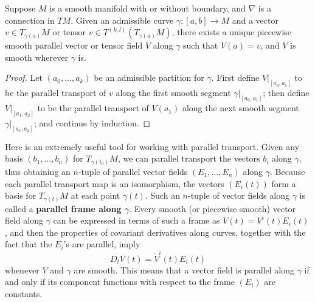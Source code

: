 \begin{corollary}
\label{cor:parallel-transport-piecewise-smooth-curves}
Suppose $M$ is a smooth manifold with or without boundary, and $\nabla$ is a connection in $TM$. Given an admissible curve $\gamma : [a,b] \to M$ and a vector $v \in T_{\gamma(a)}M$ or tensor $v \in T^{(k,l)}(T_{\gamma(a)} M)$, there exists a unique piecewise smooth parallel vector or tensor field $V$ along $\gamma$ such that $V(a) = v$, and $V$ is smooth wherever $\gamma$ is.
\end{corollary}

\begin{proof}
Let $(a_0,\ldots,a_k)$ be an admissible partition for $\gamma$. First define $V|_{[a_0,a_1]}$ to be the parallel transport of $v$ along the first smooth segment $\gamma|_{[a_0,a_1]}$; then define $V|_{[a_1,a_2]}$ to be the parallel transport of $V(a_1)$ along the next smooth segment $\gamma|_{[a_1,a_2]}$; and continue by induction.
\end{proof}

Here is an extremely useful tool for working with parallel transport. Given any basis $(b_1,\ldots,b_n)$ for $T_{\gamma(t_0)}M$, we can parallel transport the vectors $b_i$ along $\gamma$, thus obtaining an $n$-tuple of parallel vector fields $(E_1,\ldots,E_n)$ along $\gamma$. Because each parallel transport map is an isomorphism, the vectors $(E_i(t))$ form a basis for $T_{\gamma(t)}M$ at each point $\gamma(t)$. Such an $n$-tuple of vector fields along $\gamma$ is called a \textbf{parallel frame along $\gamma$}. Every smooth (or piecewise smooth) vector field along $\gamma$ can be expressed in terms of such a frame as $V(t) = V^i(t) E_i(t)$, and then the properties of covariant derivatives along curves, together with the fact that the $E_i$'s are parallel, imply
\begin{equation}
D_t V(t) = \dot{V}^i(t) E_i(t) \tag{4.23}
\end{equation}
whenever $V$ and $\gamma$ are smooth. This means that a vector field is parallel along $\gamma$ if and only if its component functions with respect to the frame $(E_i)$ are constants.

